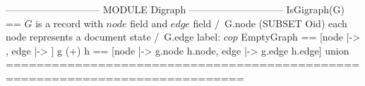 \documentclass{article}
\begin{document}
\begin{tla}
----------------------------- MODULE Digraph -----------------------------
IsGigraph(G) == \* $G$ is a record with $node$ field and $edge$ field
    /\ G.node \subseteq (SUBSET Oid) \* each node represents a document state
    /\ G.edge  \* label: $cop$
EmptyGraph == [node |-> {{}}, edge |-> {}]
g (+) h == [node |-> g.node \cup h.node, edge |-> g.edge \cup h.edge] \* union
=============================================================================
\end{tla}
\end{document}
